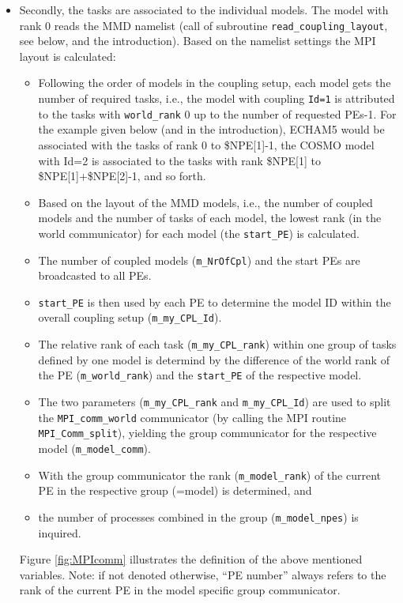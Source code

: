 \documentclass[twoside]{article}
\begin{document}
\begin{itemize}
\begin{itemize}
\begin{itemize}
\item Secondly, the tasks are associated to the individual models.
The model with rank 0 reads the MMD namelist (call of subroutine
\verb|read_coupling_layout|, see below, and the introduction). 
Based on the namelist settings the MPI layout is calculated:
\begin{itemize}
\item Following the order of models in the coupling setup, each model gets the 
number of required tasks, i.e., the model with coupling \verb|Id=1| is
 attributed to the tasks with \verb|world_rank| 0 up to the number of requested
 PEs-1. For the example given below (and in the introduction), ECHAM5 would be 
associated with
 the tasks of rank 0 to \$NPE[1]-1, the COSMO model with Id=2 is associated to the
tasks with rank \$NPE[1] to \$NPE[1]+\$NPE[2]-1, and so forth.
\item Based on the layout of the MMD models, i.e., the number of coupled models
 and the number of tasks of each model, the lowest rank (in the world 
communicator) for each model (the \verb|start_PE|) is calculated.
\item The number of coupled models (\verb|m_NrOfCpl|) and the start PEs
are broadcasted to all PEs. 
\item \verb|start_PE| is then used by each PE to determine the model ID within
 the overall coupling setup (\verb|m_my_CPL_Id|). 
\item The relative rank of each task (\verb|m_my_CPL_rank|) within one group of 
tasks defined by one model is 
 determind by the difference of the world rank of the PE (\verb|m_world_rank|)
 and the \verb|start_PE| of the respective model.
\item The two parameters (\verb|m_my_CPL_rank| and \verb|m_my_CPL_Id|) are 
used to split the \verb|MPI_comm_world| communicator 
(by calling the MPI routine \verb|MPI_Comm_split|), yielding the group 
communicator for the respective model (\verb|m_model_comm|).
\item With the group communicator the rank (\verb|m_model_rank|)  of the current
PE in the respective group (=model) is determined, and 
\item the number of processes
  combined in the group (\verb|m_model_npes|) is inquired.
\end{itemize}
Figure \ref{fig:MPIcomm} illustrates the definition of the above mentioned 
variables. Note: if not denoted otherwise, ``PE number'' always refers to the 
rank of the current PE in the model specific group communicator.
\begin{figure}

\end{figure}
\end{itemize}
\end{itemize}
\end{itemize}
\end{document}

